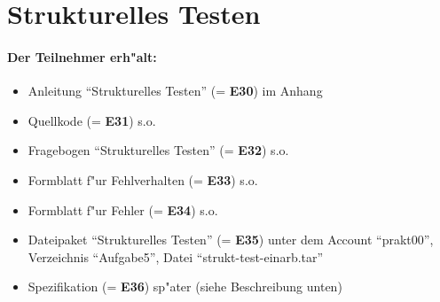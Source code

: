 \newpage
\section*{Strukturelles Testen}

\paragraph{Der Teilnehmer erh"alt:}  
\begin{itemize}
	\item Anleitung "`Strukturelles Testen"' (= {\bf E30}) im Anhang
	\item Quellkode (= {\bf E31}) s.o.
	\item Fragebogen "`Strukturelles Testen"' (= {\bf E32}) s.o.
	\item Formblatt f"ur Fehlverhalten (= {\bf E33}) s.o.
	\item Formblatt f"ur Fehler (= {\bf E34}) s.o.
	\item Dateipaket "`Strukturelles Testen"' (= {\bf E35}) unter dem 
		Account "`prakt00"', Verzeichnis "`Aufgabe5"', Datei 
		"`strukt-test-einarb.tar"'
	\item Spezifikation (= {\bf E36}) sp"ater (siehe Beschreibung unten)
\end{itemize}

